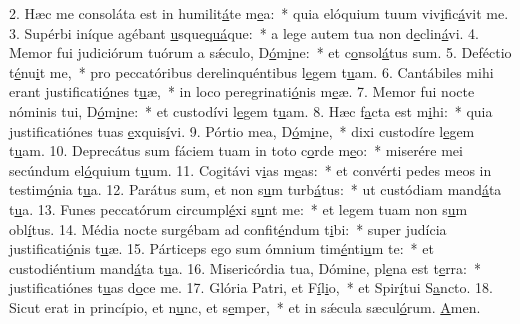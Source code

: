 2. Hæc me consoláta est in humilit\uline{á}te m\uline{e}a:~* quia elóquium tuum viv\uline{i}fic\uline{á}vit me.
3. Supérbi iníque agébant \uline{u}sque\uline{quá}que:~* a lege autem tua non d\uline{e}clin\uline{á}vi.
4. Memor fui judiciórum tuórum a sǽculo, D\uline{ó}m\uline{i}ne:~* et c\uline{o}nsol\uline{á}tus sum.
5. Deféctio t\uline{é}nu\uline{i}t me,~* pro peccatóribus derelinquéntibus l\uline{e}gem t\uline{u}am.
6. Cantábiles mihi erant justificati\uline{ó}nes t\uline{u}æ,~* in loco peregrinati\uline{ó}nis m\uline{e}æ.
7. Memor fui nocte nóminis tui, D\uline{ó}m\uline{i}ne:~* et custodívi l\uline{e}gem t\uline{u}am.
8. Hæc f\uline{a}cta est m\uline{i}hi:~* quia justificatiónes tuas \uline{e}xquis\uline{í}vi.
9. Pórtio mea, D\uline{ó}m\uline{i}ne,~* dixi custodíre l\uline{e}gem t\uline{u}am.
10. Deprecátus sum fáciem tuam in toto c\uline{o}rde m\uline{e}o:~* miserére mei secúndum el\uline{ó}quium t\uline{u}um.
11. Cogitávi v\uline{i}as m\uline{e}as:~* et convérti pedes meos in testim\uline{ó}nia t\uline{u}a.
12. Parátus sum, et non s\uline{u}m turb\uline{á}tus:~* ut custódiam mand\uline{á}ta t\uline{u}a.
13. Funes peccatórum circumpl\uline{é}xi s\uline{u}nt me:~* et legem tuam non s\uline{u}m obl\uline{í}tus.
14. Média nocte surgébam ad confit\uline{é}ndum t\uline{i}bi:~* super judícia justificati\uline{ó}nis t\uline{u}æ.
15. Párticeps ego sum ómnium tim\uline{é}nti\uline{u}m te:~* et custodiéntium mand\uline{á}ta t\uline{u}a.
16. Misericórdia tua, Dómine, pl\uline{e}na est t\uline{e}rra:~* justificatiónes t\uline{u}as d\uline{o}ce me.
17. Glória Patri, et F\uline{í}l\uline{i}o,~* et Spir\uline{í}tui S\uline{a}ncto.
18. Sicut erat in princípio, et n\uline{u}nc, et s\uline{e}mper,~* et in sǽcula sæcul\uline{ó}rum. \uline{A}men.

